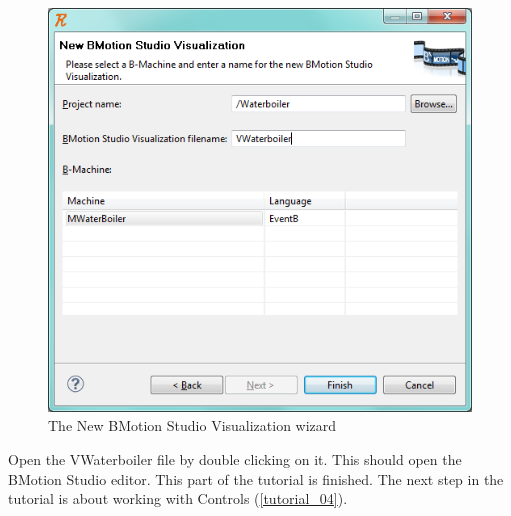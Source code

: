 \begin{figure}[!h]
\begin{center}
	\includegraphics{img/tutorial/tut_03_waterboiler3.png}
	\caption{The New BMotion Studio Visualization wizard}
	\label{fig_tut_03_waterboiler3}
\end{center}
\end{figure}

Open the VWaterboiler file by double clicking on it. This should open the BMotion Studio editor. This part of the tutorial is finished. The next step in the tutorial is about working with Controls (\ref{tutorial_04}).
